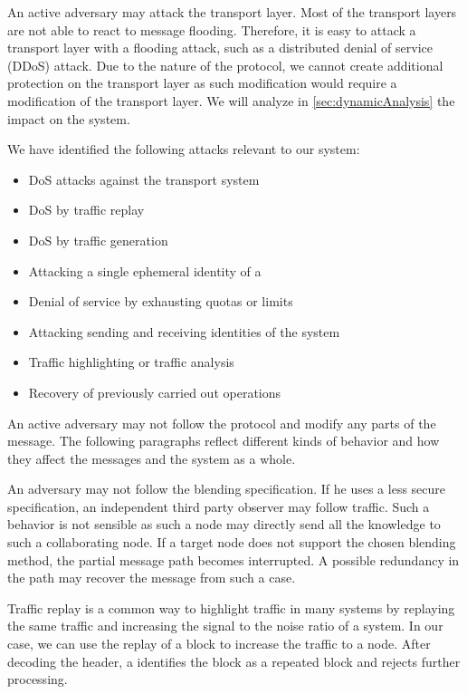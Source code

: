 An active adversary may attack the transport layer. Most of the transport layers are not able to react to message flooding. Therefore, it is easy to attack a transport layer with a flooding attack, such as a distributed denial of service (DDoS) attack. Due to the nature of the protocol, we cannot create additional protection on the transport layer as such modification would require a modification of the transport layer. We will analyze in \cref{sec:dynamicAnalysis} the impact on the \MessageVortex{} system.

We have identified the following attacks relevant to our system:
\begin{itemize}
	\item DoS attacks against the transport system
	\item DoS by traffic replay
	\item DoS by traffic generation
	\item Attacking a single ephemeral identity of a \VortexNode
	\item Denial of service by exhausting quotas or limits
	\item Attacking sending and receiving identities of the \MessageVortex{} system
	\item Traffic highlighting or traffic analysis
	\item Recovery of previously carried out operations
\end{itemize}

An active adversary may not follow the protocol and modify any parts of the message. The following paragraphs reflect different kinds of behavior and how they affect the messages and the system as a whole.

An adversary may not follow the blending specification. If he uses a less secure specification, an independent third party observer may follow traffic. Such a behavior is not sensible as such a node may directly send all the knowledge to such a collaborating node. If a  target node does not support the chosen blending method, the partial message path becomes interrupted. A possible redundancy in the path may recover the message from such a case.

Traffic replay is a common way to highlight traffic in many systems by replaying the same traffic and increasing the signal to the noise ratio of a system. In our case, we can use the replay of a \VortexMessage block to increase the traffic to a node. After decoding the header, a \VortexNode{} identifies the block as a repeated block and rejects further processing. 

